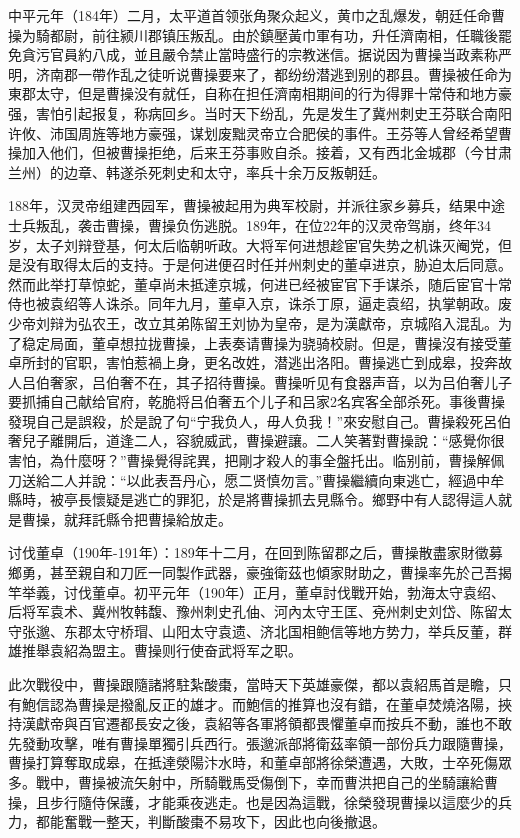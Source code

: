 中平元年（184年）二月，太平道首领张角聚众起义，黄巾之乱爆发，朝廷任命曹操为騎都尉，前往颍川郡镇压叛乱。由於鎮壓黃巾軍有功，升任濟南相，任職後罷免貪污官員約八成，並且嚴令禁止當時盛行的宗教迷信。据说因为曹操当政素称严明，济南郡一帶作乱之徒听说曹操要来了，都纷纷潜逃到别的郡县。曹操被任命为東郡太守，但是曹操没有就任，自称在担任濟南相期间的行为得罪十常侍和地方豪强，害怕引起报复，称病回乡。当时天下纷乱，先是发生了冀州刺史王芬联合南阳许攸、沛国周旌等地方豪强，谋划废黜灵帝立合肥侯的事件。王芬等人曾经希望曹操加入他们，但被曹操拒绝，后来王芬事败自杀。接着，又有西北金城郡（今甘肃兰州）的边章、韩遂杀死刺史和太守，率兵十余万反叛朝廷。

188年，汉灵帝组建西园军，曹操被起用为典军校尉，并派往家乡募兵，结果中途士兵叛乱，袭击曹操，曹操负伤逃脱。189年，在位22年的汉灵帝驾崩，终年34岁，太子刘辩登基，何太后临朝听政。大将军何进想趁宦官失势之机诛灭阉党，但是没有取得太后的支持。于是何进便召时任并州刺史的董卓进京，胁迫太后同意。然而此举打草惊蛇，董卓尚未抵達京城，何进已经被宦官下手谋杀，随后宦官十常侍也被袁绍等人诛杀。同年九月，董卓入京，诛杀丁原，逼走袁绍，执掌朝政。废少帝刘辩为弘农王，改立其弟陈留王刘协为皇帝，是为漢獻帝，京城陷入混乱。为了稳定局面，董卓想拉拢曹操，上表奏请曹操为骁骑校尉。但是，曹操沒有接受董卓所封的官职，害怕惹禍上身，更名改姓，潜逃出洛阳。曹操逃亡到成皋，投奔故人吕伯奢家，吕伯奢不在，其子招待曹操。曹操听见有食器声音，以为吕伯奢儿子要抓捕自己献给官府，乾脆将吕伯奢五个儿子和吕家2名宾客全部杀死。事後曹操發現自己是誤殺，於是說了句“宁我负人，毋人负我！”來安慰自己。曹操殺死呂伯奢兒子離開后，道逢二人，容貌威武，曹操避讓。二人笑著對曹操說：“感覺你很害怕，為什麼呀？”曹操覺得詫異，把剛才殺人的事全盤托出。临别前，曹操解佩刀送給二人并說：“以此表吾丹心，愿二贤慎勿言。”曹操繼續向東逃亡，經過中牟縣時，被亭長懷疑是逃亡的罪犯，於是將曹操抓去見縣令。鄉野中有人認得這人就是曹操，就拜託縣令把曹操給放走。

讨伐董卓（190年-191年）：189年十二月，在回到陈留郡之后，曹操散盡家財徵募鄉勇，甚至親自和刀匠一同製作武器，豪強衛茲也傾家財助之，曹操率先於己吾揭竿举義，讨伐董卓。初平元年（190年）正月，董卓討伐戰开始，勃海太守袁绍、后将军袁术、冀州牧韩馥、豫州刺史孔伷、河內太守王匡、兗州刺史刘岱、陈留太守张邈、东郡太守桥瑁、山阳太守袁遗、济北国相鲍信等地方势力，举兵反董，群雄推舉袁紹為盟主。曹操则行使奋武将军之职。

此次戰役中，曹操跟隨諸將駐紮酸棗，當時天下英雄豪傑，都以袁紹馬首是瞻，只有鮑信認為曹操是撥亂反正的雄才。而鮑信的推算也沒有錯，在董卓焚燒洛陽，挾持漢獻帝與百官遷都長安之後，袁紹等各軍將領都畏懼董卓而按兵不動，誰也不敢先發動攻擊，唯有曹操單獨引兵西行。張邈派部將衛茲率領一部份兵力跟隨曹操，曹操打算奪取成皋，在抵達滎陽汴水時，和董卓部將徐榮遭遇，大敗，士卒死傷眾多。戰中，曹操被流矢射中，所騎戰馬受傷倒下，幸而曹洪把自己的坐騎讓給曹操，且步行隨侍保護，才能乘夜逃走。也是因為這戰，徐榮發現曹操以這麼少的兵力，都能奮戰一整天，判斷酸棗不易攻下，因此也向後撤退。

